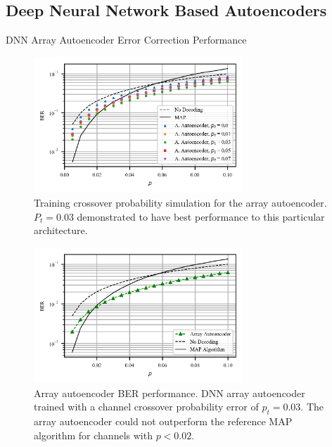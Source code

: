 \documentclass{beamer}
\begin{document}
\subsection{Deep Neural Network Based Autoencoders}
\begin{frame}[allowframebreaks]{DNN Array Autoencoder Error Correction Performance}

\begin{figure}[!ht]
  \centering
    \includegraphics[width=0.7\textwidth]{images/MAP_AutoencoderArray_Mep_65536_64_128_256_p_analysis}
    \caption{Training crossover probability simulation for the array autoencoder. $P_t=0.03$ demonstrated to have best performance to this particular architecture.}\label{fig:parrayanalysis}
\end{figure}


\begin{figure}[!ht]
  \centering
    \includegraphics[width=0.7\textwidth]{images/AutoencoderArray_Mep_65536_ptrain_003_logcosh}
    \caption{Array autoencoder BER performance. DNN array autoencoder trained with a channel crossover probability error of $p_t=0.03$. The array autoencoder could not outperform the reference MAP algorithm for channels with $p<0.02$.}\label{fig:arrayautoencoder}
\end{figure}

\end{frame}
\end{document}

